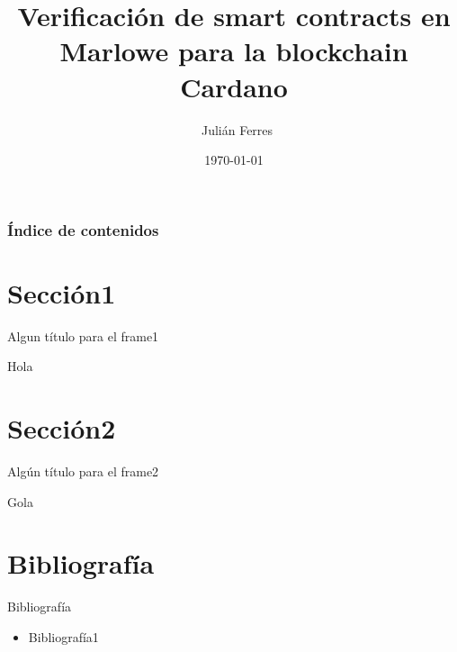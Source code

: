 \documentclass{beamer}
\title[Verificación de smart contracts en Marlowe]%
{Verificación de smart contracts en Marlowe para la blockchain Cardano}
\author[Julián Ferres] %
{~Julián Ferres}
\institute[FIUBA] %
{
  Facultad de Ingeniería\\Universidad de Buenos Aires.
}
\date{\today}
\begin{document}
\begin{frame}
	\titlepage
\end{frame}

\begin{frame} 
	\footnotesize
	\frametitle{Índice de contenidos}
	\tableofcontents
\end{frame}


\section{Sección1}
\begin{frame}{Algun título para el frame1}

Hola	

\end{frame}

\section{Sección2}
\begin{frame}{Algún título para el frame2}
	
Gola

\end{frame}


\section{Bibliografía}

\begin{frame}{Bibliografía}
	
	\begin{itemize}
		\item Bibliografía1 %
	\end{itemize}
	
\end{frame}
\end{document}
